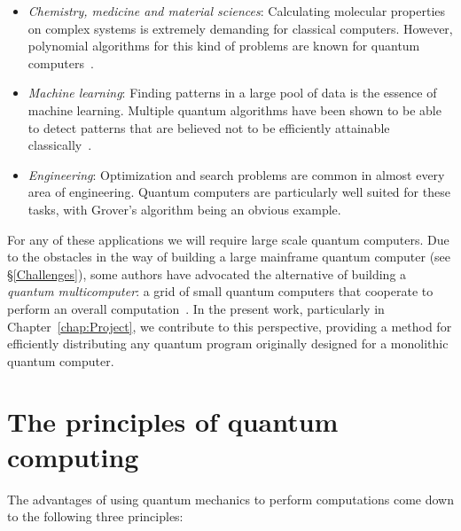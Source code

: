 \begin{itemize}
\item \textit{Chemistry, medicine and material sciences}: Calculating molecular properties on complex systems is extremely demanding for classical computers. However, polynomial algorithms for this kind of problems are known for quantum computers~\citep{TowardsQuantumChemistry}. %
\item \textit{Machine learning}: Finding patterns in a large pool of data is the essence of machine learning. Multiple quantum algorithms have been shown to be able to detect patterns that are believed not to be efficiently attainable classically~\citep{QuantumMachineLearning}.
\item \textit{Engineering}: Optimization and search problems are common in almost every area of engineering. Quantum computers are particularly well suited for these tasks, with Grover's algorithm being an obvious example.
\end{itemize}

For any of these applications we will require large scale quantum computers. Due to the obstacles in the way of building a large mainframe quantum computer (see \S\ref{Challenges}), some authors have advocated the alternative of building a \textit{quantum multicomputer}: a grid of small quantum computers that cooperate to perform an overall computation~\citep{DistributedQCHW}. In the present work, particularly in Chapter~\ref{chap:Project}, we contribute to this perspective, providing a method for efficiently distributing any quantum program originally designed for a monolithic quantum computer.

\section{The principles of quantum computing}
\label{Principles}

The advantages of using quantum mechanics to perform computations come down to the following three principles:

